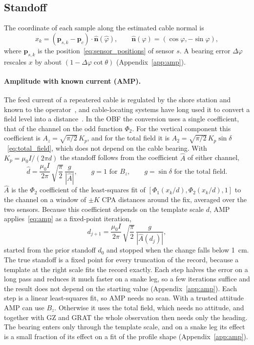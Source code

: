 \subsection{Standoff}\label{subsec:standoff}

The coordinate of each sample along the estimated cable normal is
\begin{equation}
x_k = (\mathbf{p}_{s,k} - \mathbf{p}_c) \cdot \hat{\mathbf{n}}(\hat{\varphi}), \qquad \hat{\mathbf{n}}(\varphi) = (\cos\varphi, -\sin\varphi),
\label{eq:normal_coordinate}
\end{equation}
where $\mathbf{p}_{s,k}$ is the position~\eqref{eq:sensor_positions} of sensor $s$. A bearing error $\Delta\varphi$ rescales $x$ by about $(1 - \Delta\varphi \cot\theta)$ (Appendix~\ref{app:amp}).

\paragraph{Amplitude with known current (AMP).}
The feed current of a repeatered cable is regulated by the shore station and known to the operator~\cite{chesnoy2016undersea}, and cable-locating systems have long used it to convert a field level into a distance~\cite{kdd1998maritime}. In the OBF the conversion uses a single coefficient, that of the channel on the odd function $\Phi_2$. For the vertical component this coefficient is $A_z = \sqrt{\pi/2}\,K_p$, and for the total field it is $A_2 = \sqrt{\pi/2}\,K_p \sin\delta$~\eqref{eq:total_field}, which does not depend on the cable bearing. With $K_p = \mu_0 I/(2\pi d)$ the standoff follows from the coefficient $\hat{A}$ of either channel,
\begin{equation}
\hat{d} = \frac{\mu_0 I}{2\pi}\,\sqrt{\frac{\pi}{2}}\,\frac{g}{|\hat{A}|}, \qquad g = 1 \text{ for } B_z, \qquad g = \sin\delta \text{ for the total field}.
\label{eq:amp}
\end{equation}
$\hat{A}$ is the $\Phi_2$ coefficient of the least-squares fit of $[\Phi_1(x_k/d), \Phi_2(x_k/d), 1]$ to the channel on a window of $\pm K$ CPA distances around the fix, averaged over the two sensors. Because this coefficient depends on the template scale $d$, AMP applies~\eqref{eq:amp} as a fixed-point iteration,
\begin{equation}
d_{j+1} = \frac{\mu_0 I}{2\pi}\,\sqrt{\frac{\pi}{2}}\,\frac{g}{|\hat{A}(d_j)|},
\label{eq:amp_iteration}
\end{equation}
started from the prior standoff $d_0$ and stopped when the change falls below 1~cm. The true standoff is a fixed point for every truncation of the record, because a template at the right scale fits the record exactly. Each step halves the error on a long pass and reduces it much faster on a snake leg, so a few iterations suffice and the result does not depend on the starting value (Appendix~\ref{app:amp}). Each step is a linear least-squares fit, so AMP needs no scan. With a trusted attitude AMP can use $B_z$. Otherwise it uses the total field, which needs no attitude, and together with GZ and GRAT the whole observation then needs only the heading. The bearing enters only through the template scale, and on a snake leg its effect is a small fraction of its effect on a fit of the profile shape (Appendix~\ref{app:amp}).

